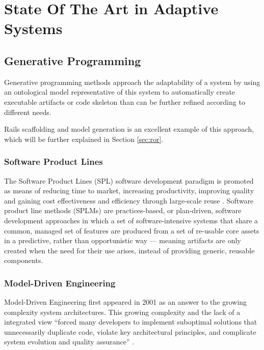 \chapter{State Of The Art in Adaptive Systems}\label{chap:sota}

\section{Generative Programming}\label{sec:generative_programming}

Generative programming methods approach the adaptability of a system by using an ontological model representative of this system to automatically create executable artifacts or code skeleton than can be further refined according to different needs.

Rails scaffolding and model generation is an excellent example of this approach, which will be further explained in Section \ref{sec:ror}.

\subsection{Software Product Lines}

The Software Product Lines (SPL) software development paradigm is promoted as means of reducing time to market, increasing productivity, improving quality and gaining cost effectiveness and efficiency through large-scale reuse \cite{TC06}. Software product line methods (SPLMs) are practices-based, or plan-driven, software development approaches in which a set of software-intensive systems that share a common, managed set of features are produced from a set of re-usable core assets in a predictive, rather than opportunistic way --- meaning artifacts are only created when the need for their use arises, instead of providing generic, reusable components.


\subsection{Model-Driven Engineering}\label{sec:mda}

Model-Driven Engineering first appeared in 2001 \cite{Mil03} as an answer to the growing complexity system architectures. This growing complexity and the lack of a integrated view ``forced many developers to implement suboptimal solutions that unnecessarily duplicate code, violate key architectural principles, and complicate system evolution and quality assurance'' \cite{Sch06}.

